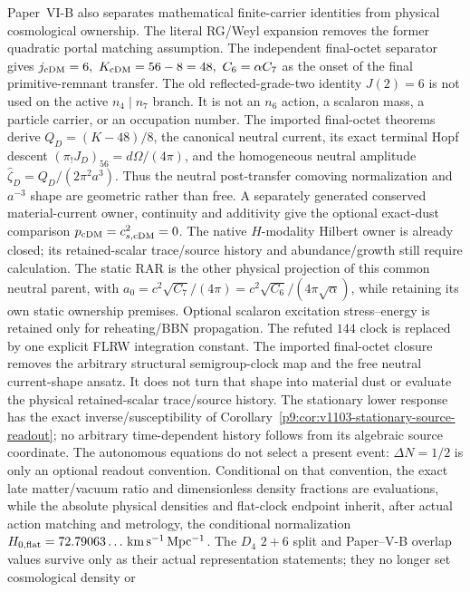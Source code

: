 \documentclass[12pt,a4paper]{article}
\begin{document}
Paper~VI-B also separates mathematical finite-carrier identities from physical
cosmological ownership.  The literal RG/Weyl expansion removes the former
quadratic portal matching assumption.  The independent final-octet separator gives
\(j_{\rm cDM}=6,\ K_{\rm cDM}=56-8=48,\ C_6=\alpha C_7\) as the onset of
the final primitive-remnant transfer. The old reflected-grade-two identity
\(J(2)=6\) is not used on the active \(n_4\mid n_7\) branch.  It is not an \(n_6\) action, a
scalaron mass, a particle carrier, or an occupation number.  The imported
final-octet theorems derive
\(Q_D=(K-48)/8\), the canonical neutral current, its exact terminal Hopf
descent \((\pi_!J_D)_{56}=d\Omega/(4\pi)\), and the homogeneous neutral
amplitude \(\widehat\zeta_D=Q_D/(2\pi^2a^3)\).  Thus the neutral post-transfer
comoving normalization and \(a^{-3}\) shape are geometric rather than free.
A separately generated conserved material-current owner, continuity and
additivity give the optional exact-dust comparison
\(p_{\rm cDM}=c_{s,\rm cDM}^2=0\).  The native $H$-modality Hilbert owner is
already closed; its retained-scalar trace/source history and abundance/growth still
require calculation.  The static RAR is the other
physical projection of this common neutral parent, with
\(a_0=c^2\sqrt{C_7}/(4\pi)=c^2\sqrt{C_6}/(4\pi\sqrt\alpha)\), while retaining
its own static ownership premises.  Optional scalaron excitation stress--energy
is retained only for reheating/BBN propagation.
The refuted \(144\) clock is replaced by one explicit FLRW integration
constant.  The imported final-octet closure removes the arbitrary structural
semigroup-clock map and the free neutral current-shape ansatz.  It does not
turn that shape into material dust or evaluate the physical retained-scalar trace/source
history.  The stationary lower response has the exact inverse/susceptibility
of Corollary~\ref{p9:cor:v1103-stationary-source-readout}; no arbitrary
time-dependent history follows from its algebraic source coordinate.  The
autonomous equations do not select a present
event: \(\Delta N=1/2\) is only an optional readout convention.  Conditional
on that convention, the exact late matter/vacuum ratio and dimensionless
density fractions are evaluations, while the absolute physical densities and
flat-clock endpoint inherit, after actual action matching and metrology, the
conditional normalization
\(H_{0,\rm flat}=72.79063\ldots\,\mathrm{km\,s^{-1}\,Mpc^{-1}}\).
The \(D_4\) \(2+6\) split and Paper--V-B overlap values survive only as their
actual representation statements; they no longer set cosmological density or
\end{document}
